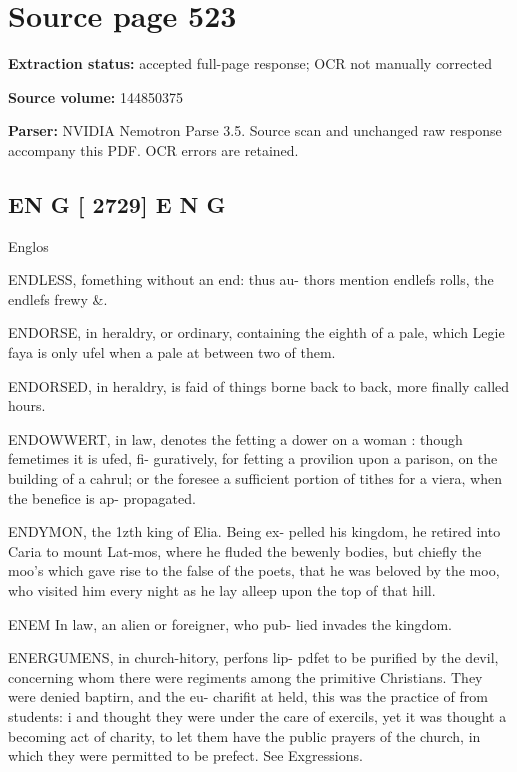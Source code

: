 \clearpage
\section{Source page 523}
\textbf{Extraction status:} accepted full-page response; OCR not manually corrected\par
\textbf{Source volume:} 144850375\par
\textbf{Parser:} NVIDIA Nemotron Parse 3.5. Source scan and unchanged raw response accompany this PDF. OCR errors are retained.\par\medskip
\subsection*{EN G [ 2729] E N G}
Englos\par\medskip
ENDLESS, fomething without an end: thus au- thors mention endlefs rolls, the endlefs frewy \&.\par\medskip
ENDORSE, in heraldry, or ordinary, containing the eighth of a pale, which Legie faya is only ufel when a pale at between two of them.\par\medskip
ENDORSED, in heraldry, is faid of things borne back to back, more finally called hours.\par\medskip
ENDOWWERT, in law, denotes the fetting a dower on a woman : though femetimes it is ufed, fi- guratively, for fetting a provilion upon a parison, on the building of a cahrul; or the foresee a sufficient portion of tithes for a viera, when the benefice is ap- propagated.\par\medskip
ENDYMON, the 1zth king of Elia. Being ex- pelled his kingdom, he retired into Caria to mount Lat-mos, where he fluded the bewenly bodies, but chiefly the moo's which gave rise to the false of the poets, that he was beloved by the moo, who visited him every night as he lay alleep upon the top of that hill.\par\medskip
ENEM In law, an alien or foreigner, who pub- lied invades the kingdom.\par\medskip
ENERGUMENS, in church-hitory, perfons lip- pdfet to be purified by the devil, concerning whom there were regiments among the primitive Christians. They were denied baptirn, and the eu- charifit at held, this was the practice of from students: i and thought they were under the care of exercils, yet it was thought a becoming act of charity, to let them have the public prayers of the church, in which they were permitted to be prefect. See Exgressions.\par\medskip
